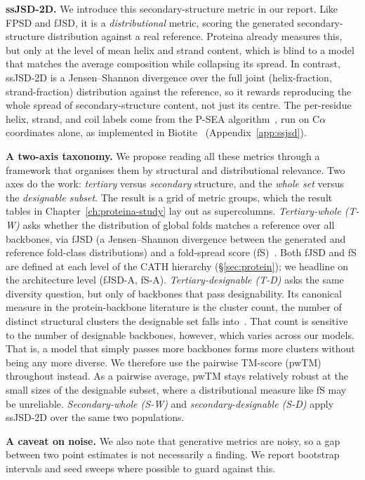 \documentclass[12pt,a4paper,twoside]{report}
\begin{document}
\textbf{ssJSD-2D.} We introduce this secondary-structure metric in our report. Like FPSD and fJSD, it is a \emph{distributional} metric, scoring the generated secondary-structure distribution against a real reference. Proteina already measures this, but only at the level of mean helix and strand content, which is blind to a model that matches the average composition while collapsing its spread. In contrast, ssJSD-2D is a Jensen--Shannon divergence over the full joint (helix-fraction, strand-fraction) distribution against the reference, so it rewards reproducing the whole spread of secondary-structure content, not just its centre. The per-residue helix, strand, and coil labels come from the P-SEA algorithm~\cite{PSEA}, run on C$\alpha$ coordinates alone, as implemented in Biotite~\cite{Biotite} (Appendix~\ref{app:ssjsd}).

\textbf{A two-axis taxonomy.} We propose reading all these metrics through a framework that organises them by structural and distributional relevance. Two axes do the work: \emph{tertiary} versus \emph{secondary} structure, and the \emph{whole set} versus the \emph{designable subset}. The result is a grid of metric groups, which the result tables in Chapter~\ref{ch:proteina-study} lay out as supercolumns. \emph{Tertiary-whole (T-W)} asks whether the distribution of global folds matches a reference over all backbones, via fJSD (a Jensen--Shannon divergence between the generated and reference fold-class distributions) and a fold-spread score (fS)~\cite{Proteina}. Both fJSD and fS are defined at each level of the CATH hierarchy (\S\ref{sec:protein}); we headline on the architecture level (fJSD-A, fS-A). \emph{Tertiary-designable (T-D)} asks the same diversity question, but only of backbones that pass designability. Its canonical measure in the protein-backbone literature is the cluster count, the number of distinct structural clusters the designable set falls into~\cite{Proteina}. That count is sensitive to the number of designable backbones, however, which varies across our models. That is, a model that simply passes more backbones forms more clusters without being any more diverse. We therefore use the pairwise TM-score (pwTM) throughout instead. As a pairwise average, pwTM stays relatively robust at the small sizes of the designable subset, where a distributional measure like fS may be unreliable. \emph{Secondary-whole (S-W)} and \emph{secondary-designable (S-D)} apply ssJSD-2D over the same two populations.

\textbf{A caveat on noise.} We also note that generative metrics are noisy, so a gap between two point estimates is not necessarily a finding. We report bootstrap intervals and seed sweeps where possible to guard against this.
\end{document}
